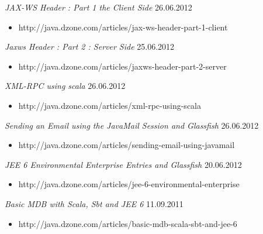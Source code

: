 \documentclass{res}
\begin{document}
\begin{resume}
{\sl JAX-WS Header : Part 1 the Client Side}  \hfill   26.06.2012	\\
\vspace{-5mm}  \begin{itemize}
\item[]  \scriptsize http://java.dzone.com/articles/jax-ws-header-part-1-client
\end{itemize}
\vspace{-2mm}

{\sl Jaxws Header : Part 2 : Server Side}  \hfill    25.06.2012	\\
\vspace{-5mm}  \begin{itemize}
\item[]  \scriptsize http://java.dzone.com/articles/jaxws-header-part-2-server
\end{itemize}
\vspace{-2mm}

{\sl XML-RPC using scala}  \hfill    26.06.2012	\\
\vspace{-5mm}  \begin{itemize}
\item[]  \scriptsize http://java.dzone.com/articles/xml-rpc-using-scala
\end{itemize}
\vspace{-2mm}

{\sl Sending an Email using the JavaMail Session and Glassfish}  \hfill    26.06.2012 \\
\vspace{-5mm}  \begin{itemize}
\item[]  \scriptsize http://java.dzone.com/articles/sending-email-using-javamail
\end{itemize}
\vspace{-2mm}

{\sl JEE 6 Environmental Enterprise Entries and Glassfish}  \hfill    20.06.2012	\\
\vspace{-5mm}  \begin{itemize}
\item[]  \scriptsize http://java.dzone.com/articles/jee-6-environmental-enterprise
\end{itemize}
\vspace{-2mm}

{\sl Basic MDB with Scala, Sbt and JEE 6}  \hfill   11.09.2011	\\
\vspace{-5mm}  \begin{itemize}
\item[]  \scriptsize http://java.dzone.com/articles/basic-mdb-scala-sbt-and-jee-6
\end{itemize}
\vspace{-2mm}


\end{resume}
\end{document}
